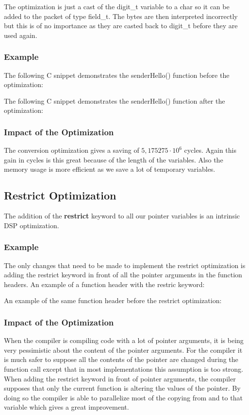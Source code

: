 \documentclass[a4paper]{article}
\begin{document}
The optimization is just a cast of the digit\_t variable to a char so it can be added to the packet of type field\_t. The bytes are then interpreted incorrectly but this is of no importance as they are casted back to digit\_t before they are used again.\\

\subsubsection{Example}
The following C snippet demonstrates the senderHello() function before the optimization:

The following C snippet demonstrates the senderHello() function after the optimization:


\subsubsection{Impact of the Optimization}
The conversion optimization gives a saving of $5,175275\cdot10^{6}$ cycles. Again this gain in cycles is this great because of the length of the variables. Also the memory usage is more efficient as we save a lot of temporary variables.

\subsection{Restrict Optimization}

The addition of the \textbf{restrict} keyword to all our pointer variables is an intrinsic DSP optimization.

\subsubsection{Example}
The only changes that need to be made to implement the restrict optimization is adding the restrict keyword in front of all the pointer arguments in the function headers. An example of a function header with the restric keyword:


An example of the same function header before the restrict optimization:



\subsubsection{Impact of the Optimization}
When the compiler is compiling code with a lot of pointer arguments, it is being very pessimistic about the content of the pointer arguments. For the compiler it is much safer to suppose all the contents of the pointer are changed during the function call except that in most implementations this assumption is too strong. When adding the restrict keyword in front of pointer arguments, the compiler supposes that only the current function is altering the values of the pointer. By doing so the compiler is able to parallelize most of the copying from and to that variable which gives a great improvement.\\
\end{document}
